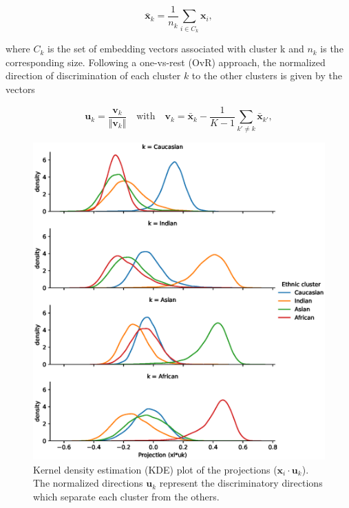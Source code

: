 \documentclass{report}
\begin{document}
\begin{equation}
\label{eq:xbar}
	\bar{\bm{x}}_k = \frac{1}{n_k}\sum_{i\in C_k}\bm{x}_i ,
\end{equation} 

\noindent where $C_k$ is the set of embedding vectors associated with cluster k and $n_k$ is the corresponding size. Following a one-vs-rest (OvR) approach, the normalized direction of discrimination of each cluster $k$ to the other clusters is given by the vectors

\begin{equation}
\label{eq:uk}
	\bm{u}_k = \frac{\bm{v}_k}{\Vert \bm{v}_k \Vert} \quad \textrm{with} \quad \bm{v}_k = \bar{\bm{x}}_k -  \frac{1}{K-1}\sum_{k' \ne k} \bar{\bm{x}}_{k'},
\end{equation} 

\begin{figure}
  \includegraphics[width=\linewidth]{projection.eps}
  \caption{Kernel density estimation (KDE) plot of the projections  ($\bm{x}_i\cdot \bm{u}_k$). The normalized directions $\bm{u}_k$ represent the discriminatory directions which separate each cluster from the others.}
  \label{fig:projection}
\end{figure}
\end{document}
